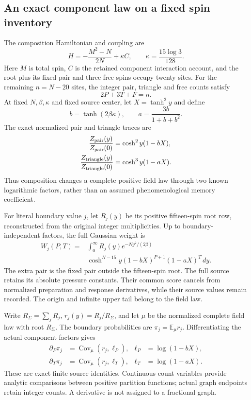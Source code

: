 \subsection{An exact component law on a fixed spin inventory}

The composition Hamiltonian and coupling are
\begin{equation}
 H=-\frac{M^2-N}{2N}+\kappa C,\qquad
 \kappa=\frac{15\log3}{128}.
\end{equation}
Here $M$ is total spin, $C$ is the retained component interaction account, and the root plus its fixed pair and three free spins occupy twenty sites. For the remaining $n=N-20$ sites, the integer pair, triangle and free counts satisfy
\begin{equation}
 2P+3T+F=n.
\end{equation}
At fixed $N,\beta,\kappa$ and fixed source center, let $X=\tanh^2y$ and define
\begin{equation}
 b=\tanh(2\beta\kappa),\qquad a=\frac{3b}{1+b+b^2}.
\end{equation}
The exact normalized pair and triangle traces are
\begin{align}
 \frac{Z_{\rm pair}(y)}{Z_{\rm pair}(0)}
 &=\cosh^2y(1-bX),\\
 \frac{Z_{\rm triangle}(y)}{Z_{\rm triangle}(0)}
 &=\cosh^3y(1-aX).
\end{align}
Thus composition changes a complete positive field law through two known logarithmic factors, rather than an assumed phenomenological memory coefficient.

For literal boundary value $j$, let $R_j(y)$ be its positive fifteen-spin root row, reconstructed from the original integer multiplicities. Up to boundary-independent factors, the full Gaussian weight is
\begin{equation}
\begin{aligned}
 W_j(P,T)={}&\int_0^\infty R_j(y)e^{-Ny^2/(2\beta)}\\
 &\cosh^{N-15}y(1-bX)^{P+1}(1-aX)^T\,dy.
\end{aligned}
\end{equation}
The extra pair is the fixed pair outside the fifteen-spin root. The full source retains its absolute pressure constants. Their common score cancels from normalized preparation and response derivatives, while their source values remain recorded. The origin and infinite upper tail belong to the field law.

Write $R_\Sigma=\sum_jR_j$, $r_j(y)=R_j/R_\Sigma$, and let $\mu$ be the normalized complete field law with root $R_\Sigma$. The boundary probabilities are $\pi_j=\mathbb E_\mu r_j$. Differentiating the actual component factors gives
\begin{align}
 \partial_P\pi_j&=\operatorname{Cov}_\mu(r_j,\ell_P),
 &\ell_P&=\log(1-bX),\\
 \partial_T\pi_j&=\operatorname{Cov}_\mu(r_j,\ell_T),
 &\ell_T&=\log(1-aX).
\end{align}
These are exact finite-source identities. Continuous count variables provide analytic comparisons between positive partition functions; actual graph endpoints retain integer counts. A derivative is not assigned to a fractional graph.

